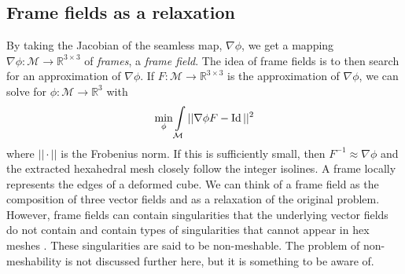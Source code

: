 \documentclass[../thesis.tex]{subfiles}
\begin{document}
\subsection{Frame fields as a relaxation}
By taking the Jacobian of the seamless map, $\nabla \phi$, we get a mapping
$\nabla \phi : \mathcal{M} \to \mathbb{R}^{3\times3}$ of \emph{frames}, a \emph{frame field}.
The idea of frame fields is to then search for an approximation of $\nabla \phi$.
If $F: \mathcal{M} \to \mathbb{R}^{3\times3}$ is the approximation of $\nabla \phi$, we can
solve for $\phi : \mathcal{M} \to \mathbb{R}^3$ with
\begin{equation}
  \min \limits_{\phi} \int \limits_{\mathcal{M}} ||\nabla \phi F - \operatorname{Id}||^2
\end{equation}\label{eq:poisson}
where $||\cdot||$ is the Frobenius norm. If this is sufficiently small, then $F^{-1} \approx \nabla \phi$ and 
the extracted hexahedral mesh closely follow the integer isolines.
A frame locally represents the edges of a deformed cube.
We can think of a frame field as the composition of three vector fields
and as a relaxation of the original problem. However, frame fields
can contain singularities that the underlying vector fields do not contain \cite{Nieser}
and contain types of singularities that cannot appear in hex meshes \cite{Liu}.
These singularities are said to be non-meshable.
The problem of non-meshability is not discussed further here, but it
is something to be aware of.
\end{document}
